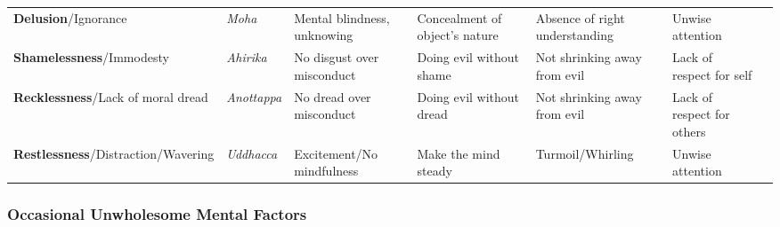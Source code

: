 \documentclass[a4 paper, 12pt]{article}
\begin{document}
\begin{tabular}{P{0.21\textwidth} | C{.13\textwidth} C{.165\textwidth} C{0.165\textwidth} C{0.165\textwidth} C{0.165\textwidth} m{0mm}}
\toprule
 &  &  &  &  & \\
\midrule

\textbf{Delusion}/\newline Ignorance & \textit{Moha} & Mental blindness, unknowing & Concealment of object’s nature & Absence of right understanding & Unwise attention  &\\[9mm]
\textbf{Shamelessness}/\newline Immodesty & \textit{Ahirika} & No disgust over misconduct & Doing evil without shame & Not shrinking away from evil & Lack of respect for self &\\[9mm]
\textbf{Recklessness}/\newline Lack of moral dread & \textit{Anottappa} & No dread over misconduct & Doing evil without dread & Not shrinking away from evil & Lack of respect for others &\\[9mm]
\textbf{Restlessness}/\newline Distraction/Wavering & \textit{Uddhacca} & Excitement/\newline No mindfulness & Make the mind steady & Turmoil/\newline Whirling & Unwise attention &\\[9mm]
\bottomrule
\end{tabular} 

\subsubsection*{Occasional Unwholesome Mental Factors}
\end{document}
